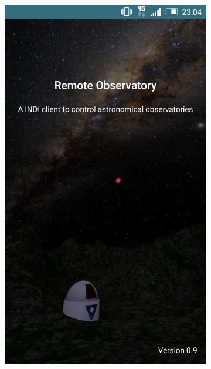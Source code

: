 \begin{figure}
    \centering
    \begin{subfigure}[]{0.4\textwidth}
        \includegraphics[width=\textwidth]{../images/captura6.png}
        \caption{}
        \label{fig:captura4}
    \end{subfigure}
    \begin{subfigure}[]{0.4\textwidth}

\end{subfigure}
\end{figure}
